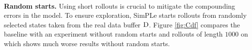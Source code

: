 \vspace{0.1cm}\\\textbf{Random starts.} Using short rollouts is crucial to mitigate the compounding errors in the model. To ensure exploration, SimPLe starts rollouts from randomly selected states taken from the real data buffer $\textsc{D}$. Figure \ref{fig:Cdf} compares the baseline with an experiment without random starts and rollouts of length $1000$ on {\seaquest} which shows much worse results without random starts.




